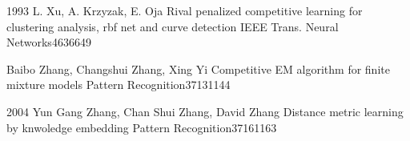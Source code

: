  {1993} {L. Xu, A. Krzyzak, E. Oja}
{Rival penalized competitive learning for clustering analysis, rbf net and curve detection}
{IEEE Trans. Neural Networks}{4}{636}{649}

 {Baibo Zhang, Changshui Zhang, Xing Yi}
{Competitive EM algorithm for finite mixture models}
{Pattern Recognition}{37}{131}{144}

 {2004} {Yun Gang Zhang, Chan Shui Zhang, David Zhang}
{Distance metric learning by knwoledge embedding}
{Pattern Recognition}{37}{161}{163}

